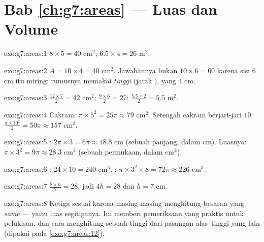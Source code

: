 \section*{Bab \ref{ch:g7:areas} --- Luas dan Volume}

\begin{solution}{exo:g7:areas:1}
$8 \times 5 = 40$ cm$^2$; \qquad $6.5 \times 4 = 26$ m$^2$.
\end{solution}

\begin{solution}{exo:g7:areas:2}
$A = 10 \times 4 = 40$ cm$^2$. Jawabannya bukan
$10 \times 6 = 60$ karena sisi $6$ cm itu miring: rumusnya
memakai \emph{tinggi} (jarak ), yang $4$ cm.
\end{solution}

\begin{solution}{exo:g7:areas:3}
$\frac{12 \times 7}{2} = 42$ cm$^2$; \quad
$\frac{9 \times 6}{2} = 27$; \quad
$\frac{5.5 \times 2}{2} = 5.5$ m$^2$.
\end{solution}

\begin{solution}{exo:g7:areas:4}
Cakram: $\pi \times 5^2 = 25\pi \approx 79$ cm$^2$. Setengah cakram
berjari-jari $10$: $\frac{\pi \times 10^2}{2} = 50\pi \approx 157$ cm$^2$.
\end{solution}

\begin{solution}{exo:g7:areas:5}
: $2\pi \times 3 = 6\pi \approx 18.8$ cm (sebuah panjang,
dalam cm). Luasnya: $\pi \times 3^2 = 9\pi \approx 28.3$ cm$^2$
(sebuah permukaan, dalam cm$^2$).
\end{solution}

\begin{solution}{exo:g7:areas:6}
: $24 \times 10 = 240$ cm$^3$. :
$\pi \times 3^2 \times 8 = 72\pi \approx 226$ cm$^3$.
\end{solution}

\begin{solution}{exo:g7:areas:7}
$\frac{8 \times h}{2} = 28$, jadi $4h = 28$ dan $h = 7$ cm.
\end{solution}

\begin{solution}{exo:g7:areas:8}
Ketiga  sesuai karena masing-masing menghitung besaran
yang \emph{sama} --- yaitu luas segitiganya. Ini memberi pemeriksaan
yang praktis untuk pelukisan, dan cara menghitung sebuah tinggi dari
pasangan alas--tinggi yang lain (dipakai pada \cref{exo:g7:areas:12}).
\end{solution}

